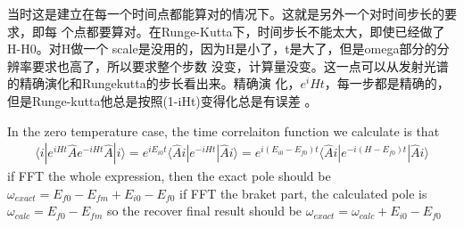 \documentclass[a4paper,11pt]{ctexart}
\begin{document}
当时这是建立在每一个时间点都能算对的情况下。这就是另外一个对时间步长的要求，即每
个点都要算对。在Runge-Kutta下，时间步长不能太大，即使已经做了H-H0。对H做一个
scale是没用的，因为H是小了，t是大了，但是omega部分的分辨率要求也高了，所以要求整个步数
没变，计算量没变。这一点可以从发射光谱的精确演化和Rungekutta的步长看出来。精确演
化，$e^iHt$，每一步都是精确的，但是Runge-kutta他总是按照(1-iHt)变得化总是有误差
。

In the zero temperature case, the time correlaiton function we calculate is that
\begin{gather}
    \langle i | e^{iHt} \hat{A} e^{-iHt} \hat{A} | i \rangle 
    = e^{iE_{i0} t} \langle \hat{A}i | e^{-iHt} | \hat{A} i \rangle 
    = e^{i(E_{i0}-E_{f0}) t} \langle \hat{A}i | e^{-i(H-E_{f0})t} | \hat{A} i \rangle
\end{gather}
if FFT the whole expression, then the exact pole should be
$\omega_{exact} = E_{f0}-E_{fm} + E_{i0}-E_{f0}$
if FFT the braket part, the calculated pole is 
$\omega_{calc} = E_{f0}-E_{fm}$
so the recover final result should be 
$\omega_{exact} = \omega_{calc} + E_{i0}-E_{f0}$
\end{document}
